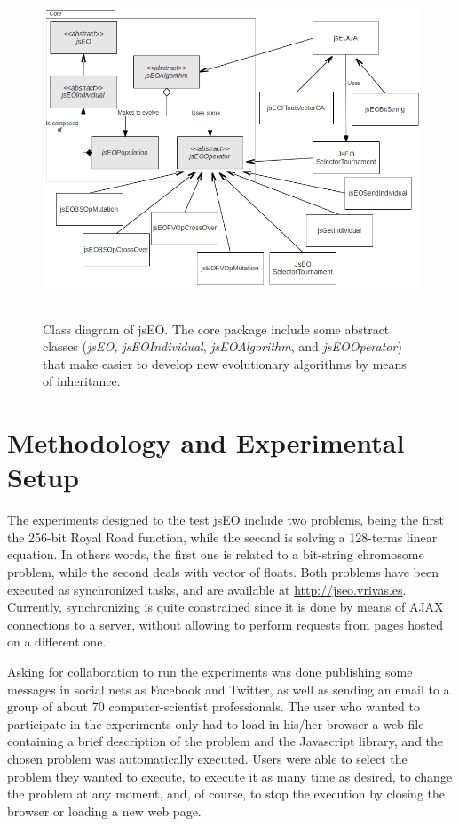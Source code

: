 \documentclass[runningheads,a4paper]{llncs}
\begin{document}
\begin{figure}
\centering
\includegraphics[height=10cm]{class-diagram}
\caption{Class diagram of jsEO. The core package include some abstract classes (\textit{jsEO, jsEOIndividual}, \textit{jsEOAlgorithm}, and \textit{jsEOOperator}) that make easier to develop new evolutionary algorithms by means of inheritance.}
\label{fig:jsEO-class-diagram}
\end{figure}


\section{Methodology and Experimental Setup}
\label{sec:method}
The experiments designed to the test jsEO include two problems, being the first the 256-bit Royal Road function, while the second is solving a 128-terms linear equation. In others words, the first one is related to a bit-string chromosome problem, while the second deals with vector of floats. Both problems have been executed as synchronized tasks, and are available at \url{http://jseo.vrivas.es}. Currently, synchronizing is quite constrained since it is done by means of AJAX connections to a server, without allowing to perform requests from pages hosted on a different one. 

Asking for collaboration to run the experiments was done publishing some messages in social nets as Facebook and Twitter, as well as sending an email to a group of about 70 computer-scientist professionals. The user who wanted to participate in the experiments only had to load in his/her browser a web file containing a brief description of the problem and the Javascript library, and the chosen problem was automatically executed. Users were able to select the problem they wanted to execute, to execute it as many time as desired, to change the problem at any moment, and, of course, to stop the execution by closing the browser or loading a new web page.
\end{document}

